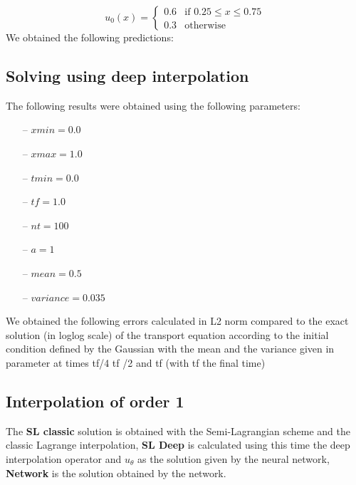 \documentclass{article}
\begin{document}
\begin{equation*}
    u_0(x) = \begin{cases}
    0.6 & \text{if } 0.25 \leq x \leq 0.75\\
    0.3 & \text{otherwise}
    \end{cases}
\end{equation*} We obtained the following predictions:

\subsection{Solving using deep interpolation}
The following results were obtained using the following parameters:

\begin{itemize}
    \item[--]$xmin = 0.0$
    \item[--] $xmax = 1.0$
    \item[--] $tmin = 0.0$
    \item[--] $tf = 1.0$
    \item[--] $nt = 100$
    \item[--] $a = 1$
    \item[--] $mean = 0.5$
    \item[--] $variance = 0.035$
\end{itemize}

We obtained the following errors calculated in L2 norm compared to the exact solution (in loglog scale) of the transport equation according to the initial condition defined by the Gaussian with the mean and the variance given in parameter at times tf/4 tf /2 and tf (with tf the final time)
\subsection{Interpolation of order 1}

The \textbf{SL classic} solution is obtained with the Semi-Lagrangian scheme and the classic Lagrange interpolation, \textbf{SL Deep} is calculated using this time the deep interpolation operator and $u_\theta $ as the solution given by the neural network, \textbf{Network} is the solution obtained by the network.\\
\end{document}
